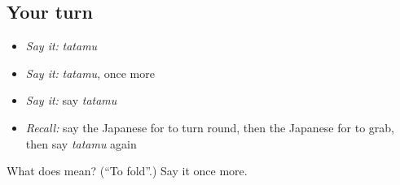 \subsection*{Your turn}
\begin{itemize}
\raggedright
  \item \emph{Say it:} \emph{tatamu}
  \item \emph{Say it:} \emph{tatamu}, once more
  \item \emph{Say it:} say \emph{tatamu}
  \item \emph{Recall:} say the Japanese for to turn round, then the Japanese for to grab, then say \emph{tatamu} again
\end{itemize}

\begin{tcolorbox}[breakable,colback=teal!4,colframe=teal!35!black,title={Before you move on}]
What does  mean? (\textquotedblleft{}To fold\textquotedblright{}.) Say it once more.
\end{tcolorbox}
